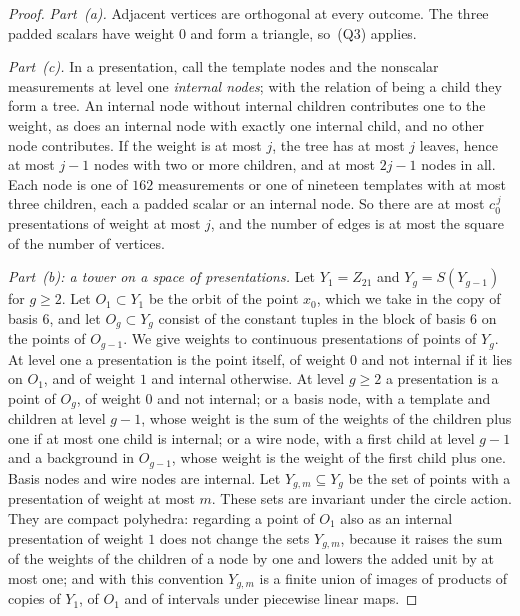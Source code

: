 \begin{proof}
\emph{Part~\textup{(a)}.} Adjacent vertices are orthogonal at every outcome. The three padded scalars have weight $0$ and form a triangle, so~(Q3) applies.

\emph{Part~\textup{(c)}.} In a presentation, call the template nodes and the nonscalar measurements at level one \emph{internal nodes}; with the relation of being a child they form a tree. An internal node without internal children contributes one to the weight, as does an internal node with exactly one internal child, and no other node contributes. If the weight is at most $j$, the tree has at most $j$ leaves, hence at most $j-1$ nodes with two or more children, and at most $2j-1$ nodes in all. Each node is one of $162$ measurements or one of nineteen templates with at most three children, each a padded scalar or an internal node. So there are at most $c_0^{\,j}$ presentations of weight at most $j$, and the number of edges is at most the square of the number of vertices.

\emph{Part~\textup{(b)}: a tower on a space of presentations.} Let $Y_1=Z_{21}$ and $Y_g=S(Y_{g-1})$ for $g\ge2$. Let $O_1\subset Y_1$ be the orbit of the point $x_0$, which we take in the copy of basis $6$, and let $O_g\subset Y_g$ consist of the constant tuples in the block of basis $6$ on the points of $O_{g-1}$. We give weights to continuous presentations of points of $Y_g$. At level one a presentation is the point itself, of weight $0$ and not internal if it lies on $O_1$, and of weight $1$ and internal otherwise. At level $g\ge2$ a presentation is a point of $O_g$, of weight $0$ and not internal; or a basis node, with a template and children at level $g-1$, whose weight is the sum of the weights of the children plus one if at most one child is internal; or a wire node, with a first child at level $g-1$ and a background in $O_{g-1}$, whose weight is the weight of the first child plus one. Basis nodes and wire nodes are internal. Let $Y_{g,m}\subseteq Y_g$ be the set of points with a presentation of weight at most $m$. These sets are invariant under the circle action. They are compact polyhedra: regarding a point of $O_1$ also as an internal presentation of weight $1$ does not change the sets $Y_{g,m}$, because it raises the sum of the weights of the children of a node by one and lowers the added unit by at most one; and with this convention $Y_{g,m}$ is a finite union of images of products of copies of $Y_1$, of $O_1$ and of intervals under piecewise linear maps.


\end{proof}
